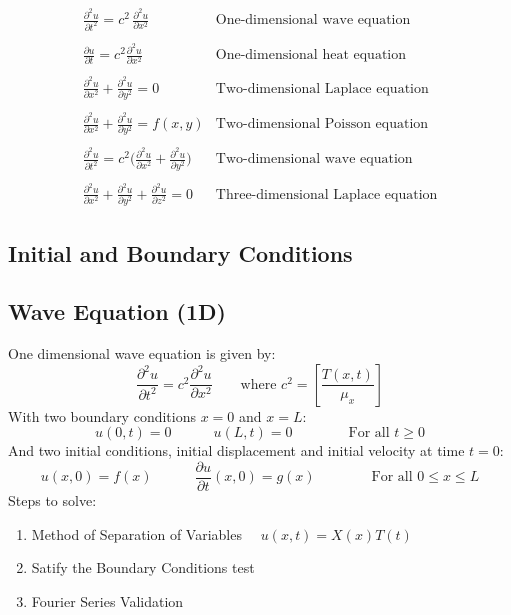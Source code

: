 $$\begin{array}{ll}
  \displaystyle \frac{\partial^{2}u}{\partial t^{2}}=c^{2}\,\frac{\partial^{2}u}{\partial x^{2}}&\text{One-dimensional wave equation}\\ \\
  \displaystyle{\frac{\partial u}{\partial t}}=c^{2}{\frac{\partial^{2}u}{\partial x^{2}}}&\text{One-dimensional heat equation}\\ \\
 \displaystyle {\frac{\partial^{2}u}{\partial x^{2}}}+{\frac{\partial^{2}u}{\partial y^{2}}}=0&\text{Two-dimensional Laplace equation}\\ \\
 \displaystyle {\frac{\partial^{2}u}{\partial x^{2}}}+{\frac{\partial^{2}u}{\partial y^{2}}}=f(x,y)&\text{Two-dimensional Poisson equation}\\ \\
 \displaystyle \frac{\partial^{2}u}{\partial t^{2}}=c^{2}\biggl(\frac{\partial^{2}u}{\partial x^{2}}+\frac{\partial^{2}u}{\partial y^{2}}\biggr)&\text{Two-dimensional wave equation}\\ \\
 \displaystyle {\frac{\partial^{2}u}{\partial x^{2}}}+{\frac{\partial^{2}u}{\partial y^{2}}}+{\frac{\partial^{2}u}{\partial z^{2}}}=0&\text{Three-dimensional Laplace equation}
\end{array}$$
\subsection{Initial and Boundary Conditions}

\subsection{Wave Equation (1D)}
One dimensional wave equation is given by:
\begin{equation}
  \frac{\partial^2 u}{\partial t^2} = c^2 \frac{\partial^2 u}{\partial x^2}\quad\quad\text{where }c^2=\left[\frac{T(x,t)}{\mu_x}\right]
  \label{eq:wave1d}
\end{equation}
With two boundary conditions $x=0$ and $x=L$:
$$u(0,t)=0\qquad\quad u(L,t)=0\qquad\qquad \text{For all }t\geq 0$$
And two initial conditions, initial displacement and initial velocity at time $t=0$:
$$u(x,0)=f(x)\qquad\quad \frac{\partial u}{\partial t}(x,0)=g(x)\qquad\qquad \text{For all }0\leq x\leq L$$
Steps to solve:
\begin{enumerate}
  \item Method of Separation of Variables $\quad u(x,t)=X(x)T(t)$
  \item Satify the Boundary Conditions test
  \item Fourier Series Validation

\end{enumerate}
